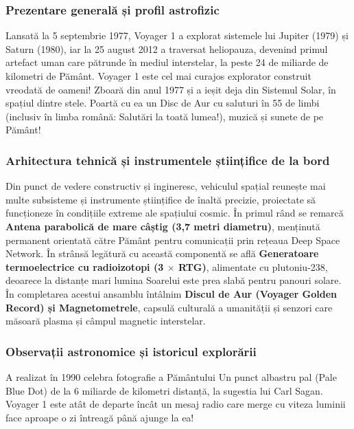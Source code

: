\subsubsection*{Prezentare generală și profil astrofizic}
Lansată la 5 septembrie 1977, Voyager 1 a explorat sistemele lui Jupiter (1979) și Saturn (1980), iar la 25 august 2012 a traversat heliopauza, devenind primul artefact uman care pătrunde în mediul interstelar, la peste 24 de miliarde de kilometri de Pământ. Voyager 1 este cel mai curajos explorator construit vreodată de oameni! Zboară din anul 1977 și a ieșit deja din Sistemul Solar, în spațiul dintre stele. Poartă cu ea un \guillemotleft{}Disc de Aur\guillemotright{} cu saluturi în 55 de limbi (inclusiv în limba română: \guillemotleft{}Salutări la toată lumea!\guillemotright{}), muzică și sunete de pe Pământ!

\subsubsection*{Arhitectura tehnică și instrumentele științifice de la bord}
Din punct de vedere constructiv și ingineresc, vehiculul spațial reunește mai multe subsisteme și instrumente științifice de înaltă precizie, proiectate să funcționeze în condițiile extreme ale spațiului cosmic. În primul rând se remarcă \textbf{Antena parabolică de mare câștig (3,7 metri diametru)}, menținută permanent orientată către Pământ pentru comunicații prin rețeaua Deep Space Network. În strânsă legătură cu această componentă se află \textbf{Generatoare termoelectrice cu radioizotopi (3 $\times$ RTG)}, alimentate cu plutoniu-238, deoarece la distanțe mari lumina Soarelui este prea slabă pentru panouri solare. În completarea acestui ansamblu întâlnim \textbf{Discul de Aur (Voyager Golden Record) și Magnetometrele}, capsulă culturală a umanității și senzori care măsoară plasma și câmpul magnetic interstelar.

\subsubsection*{Observații astronomice și istoricul explorării}
A realizat în 1990 celebra fotografie a Pământului \guillemotleft{}Un punct albastru pal\guillemotright{} (Pale Blue Dot) de la 6 miliarde de kilometri distanță, la sugestia lui Carl Sagan. Voyager 1 este atât de departe încât un mesaj radio care merge cu viteza luminii face aproape o zi întreagă până ajunge la ea!

